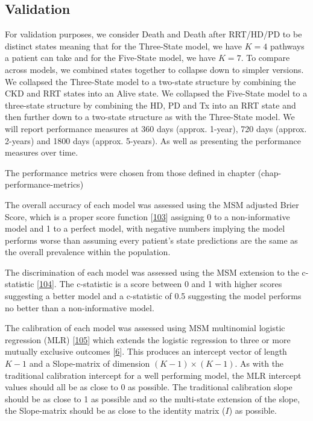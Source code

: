 \documentclass[12pt,PhD,twoside,openright]{muthesis}
\begin{document}
\hypertarget{validation-2}{%
\subsection{Validation}\label{validation-2}}

For validation purposes, we consider Death and Death after RRT/HD/PD to be distinct states meaning that for the Three-State model, we have \(K=4\) pathways a patient can take and for the Five-State model, we have \(K=7\). To compare across models, we combined states together to collapse down to simpler versions. We collapsed the Three-State model to a two-state structure by combining the CKD and RRT states into an Alive state. We collapsed the Five-State model to a three-state structure by combining the HD, PD and Tx into an RRT state and then further down to a two-state structure as with the Three-State model. We will report performance measures at 360 days (approx. 1-year), 720 days (approx. 2-years) and 1800 days (approx. 5-years). As well as presenting the performance measures over time.

The performance metrics were chosen from those defined in chapter (chap-performance-metrics)

The overall accuracy of each model was assessed using the MSM adjusted Brier Score, which is a proper score function {[}\protect\hyperlink{ref-gneiting_strictly_2007}{103}{]} assigning 0 to a non-informative model and 1 to a perfect model, with negative numbers implying the model performs worse than assuming every patient's state predictions are the same as the overall prevalence within the population.

The discrimination of each model was assessed using the MSM extension to the c-statistic {[}\protect\hyperlink{ref-calster_extending_2012-1}{104}{]}. The c-statistic is a score between 0 and 1 with higher scores suggesting a better model and a c-statistic of 0.5 suggesting the model performs no better than a non-informative model.

The calibration of each model was assessed using MSM multinomial logistic regression (MLR) {[}\protect\hyperlink{ref-hoorde_assessing_2014}{105}{]} which extends the logistic regression to three or more mutually exclusive outcomes {[}\protect\hyperlink{ref-riley_prognosis_2019}{6}{]}. This produces an intercept vector of length \(K-1\) and a Slope-matrix of dimension \((K-1) \times (K-1)\). As with the traditional calibration intercept for a well performing model, the MLR intercept values should all be as close to 0 as possible. The traditional calibration slope should be as close to 1 as possible and so the multi-state extension of the slope, the Slope-matrix should be as close to the identity matrix (\(I\)) as possible.
\end{document}
